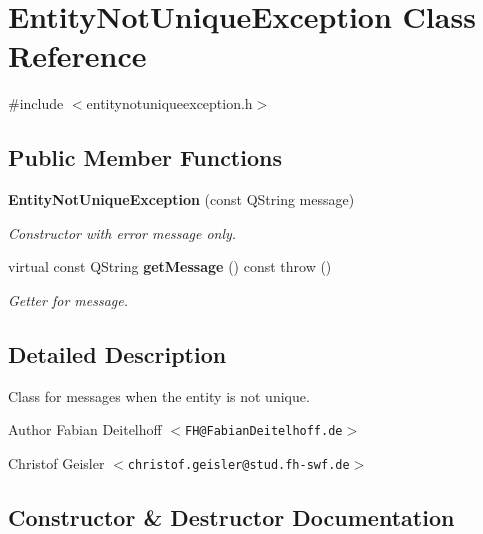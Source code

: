 \section{\-Entity\-Not\-Unique\-Exception \-Class \-Reference}
\label{d6/d19/classEntityNotUniqueException}


{\ttfamily \#include $<$entitynotuniqueexception.\-h$>$}

\subsection*{\-Public \-Member \-Functions}
\begin{DoxyCompactItemize}
\item 
{\bf \-Entity\-Not\-Unique\-Exception} (const \-Q\-String message)
\begin{DoxyCompactList}\small\item\em \-Constructor with error message only. \end{DoxyCompactList}\item 
virtual const \-Q\-String {\bf get\-Message} () const   throw ()
\begin{DoxyCompactList}\small\item\em \-Getter for message. \end{DoxyCompactList}\end{DoxyCompactItemize}


\subsection{\-Detailed \-Description}
\-Class for messages when the entity is not unique.

\begin{DoxyAuthor}{\-Author}
\-Fabian \-Deitelhoff $<${\tt \-F\-H@\-Fabian\-Deitelhoff.\-de}$>$ 

\-Christof \-Geisler $<${\tt christof.\-geisler@stud.\-fh-\/swf.\-de}$>$ 
\end{DoxyAuthor}


\subsection{\-Constructor \& \-Destructor \-Documentation}
